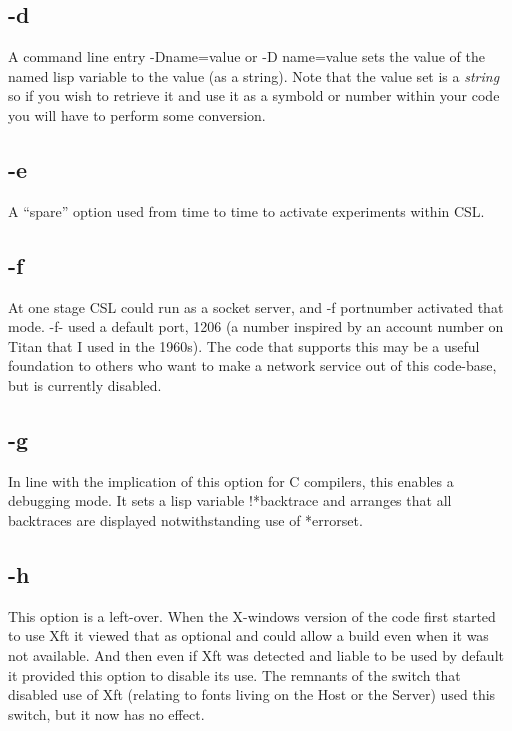 \documentclass[a4paper,11pt]{article}
\begin{document}
\subsection{\ttfamily -d}
   A command line entry {\ttfamily -Dname=value} or {\ttfamily -D name=value}
   sets the value of the named lisp variable to the value (as a string).
   Note that the value set is a {\em string} so if you wish to retrieve
   it and use it as a symbold or number within your code you will have to
   perform some conversion.

\subsection{\ttfamily -e}
   A ``spare'' option used from time to time to activate experiments within
   CSL.

\subsection{\ttfamily -f}
   At one stage CSL could run as a socket server, and {\ttfamily -f portnumber}
   activated that mode. {\ttfamily -f-} used a default port, 1206 (a number
   inspired by an account number on Titan that I used in the 1960s). The code
   that supports this may be a useful foundation to others who want to make a
   network service out of this code-base, but is currently disabled.

\subsection{\ttfamily -g}
   In line with the implication of this option for C compilers, this enables
   a debugging mode. It sets a lisp variable {\ttfamily !*backtrace} and
   arranges that all backtraces are displayed notwithstanding use of
 *{\ttfamily errorset}.

\subsection{\ttfamily -h}
   This option is a left-over. When the X-windows version of the code first
   started to use Xft it viewed that as optional and could allow a build even when
   it was not available. And then even if Xft was detected and liable to be used
   by default it provided this option to disable its use. The remnants of the
   switch that disabled use of Xft (relating to fonts living on the Host or
   the Server) used this switch, but it now has no effect.
\end{document}
